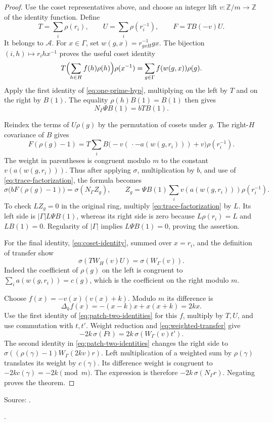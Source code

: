 \documentclass[11pt,a4paper]{article}
\theoremstyle{definition}
\newcommand{\Z}{\mathbb Z}
\newcommand{\src}[2]{\par\smallskip\begingroup\footnotesize\noindent Source: \path{#1}.\par\noindent\path{#2}.\par\endgroup}
\begin{document}
\begin{proof}
Use the coset representatives above, and choose
an integer lift \(v:\Z/m\to\Z\) of the identity
function. Define
\[
 T=\sum_i\rho(r_i),\qquad
 U=\sum_i\rho(r_i^{-1}),\qquad
 F=T B(-v) U .
\]
It belongs to \(\mathcal A\).
For \(x\in\Gamma\), set
\(w(g,x)=r_{gxH}^{-1}gx\).
The bijection
\((i,h)\mapsto r_i h x^{-1}\) proves the useful
coset identity
\begin{equation}\label{eq:coset-identity}
 T\Bigl(\sum_{h\in H}f(h)\rho(h)\Bigr)\rho(x^{-1})
      =\sum_{g\in\Gamma}f(w(g,x))\rho(g).
\end{equation}
Apply the first identity of
\eqref{eq:one-prime-hyp}, multiplying on the
left by \(T\) and on the right by \(B(1)\).
The equality \(\rho(h)B(1)=B(1)\) then gives
\begin{equation}\label{eq:trace-factorization}
 N_\Gamma\Psi B(1)=bT B(1).
\end{equation}

Reindex the terms of \(U\rho(g)\) by the
permutation of cosets under \(g\).
The right-\(H\) covariance of \(B\) gives
\[
 F(\rho(g)-1)
  =T\sum_i
   B\bigl(-v(\,\cdot-a(w(g,r_i)))+v\bigr)
                             \rho(r_i^{-1}).
\]
The weight in parentheses is congruent modulo
\(m\) to the constant \(v(a(w(g,r_i)))\).
Thus after applying \(\sigma\), multiplication
by \(b\), and use of
\eqref{eq:trace-factorization}, the formula becomes
\[
 \sigma\bigl(bF(\rho(g)-1)\bigr)
       =\sigma(N_\Gamma Z_g),\qquad
 Z_g=\Psi B(1)\sum_i
       v(a(w(g,r_i)))\rho(r_i^{-1}).
\]
To check \(LZ_g=0\) in the original ring, multiply
\eqref{eq:trace-factorization} by \(L\).
Its left side is
\(|\Gamma|L\Psi B(1)\), whereas its right side
is zero because \(L\rho(r_i)=L\) and \(LB(1)=0\).
Regularity of \(|\Gamma|\) implies
\(L\Psi B(1)=0\), proving the assertion.

For the final identity,
\eqref{eq:coset-identity}, summed over \(x=r_i\),
and the definition of transfer show
\begin{equation}\label{eq:weighted-transfer}
 \sigma(TW_H(v)U)=\sigma(W_\Gamma(v)).
\end{equation}
Indeed the coefficient of \(\rho(g)\) on the
left is congruent to
\(\sum_i a(w(g,r_i))=c(g)\), which is the
coefficient on the right modulo \(m\).

Choose \(f(x)=-v(x)(v(x)+k)\).
Modulo \(m\) its difference is
\[
 \Delta_k f(x)=-(x-k)x+x(x+k)=2kx.
\]
Use the first identity of
\eqref{eq:patch-two-identities} for this \(f\),
multiply by \(T,U\), and use commutation with
\(t,t'\). Weight reduction and
\eqref{eq:weighted-transfer} give
\[
 -2k\,\sigma(Ft)
            =2k\,\sigma(W_\Gamma(v)t').
\]
The second identity in
\eqref{eq:patch-two-identities} changes the
right side to
\(\sigma((\rho(\gamma)-1)W_\Gamma(2kv)r)\).
Left multiplication of a weighted sum by
\(\rho(\gamma)\) translates its weight by
\(c(\gamma)\). Its difference weight is
congruent to \(-2k c(\gamma)=-2k\pmod m\).
The expression is therefore
\(-2k\,\sigma(N_\Gamma r)\).
Negating proves the theorem.
\end{proof}
\src{New/Patching/OnePrime.lean}{one_prime_first_order}
\end{document}
